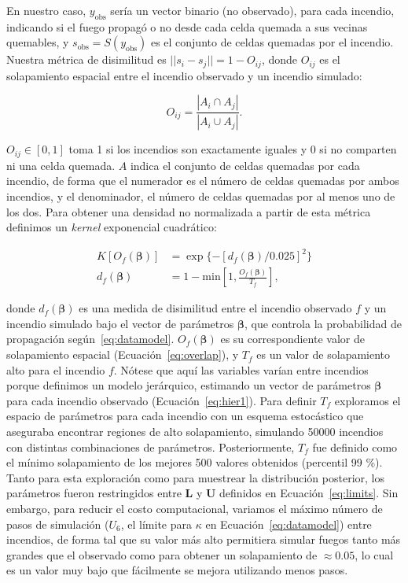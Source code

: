 En nuestro caso, $y_{\text{obs}}$ sería un vector binario (no observado), para cada incendio, indicando si el fuego propagó o no desde cada celda quemada a sus vecinas quemables, y $s_{\text{obs}} = S(y_{\text{obs}})$ es el conjunto de celdas quemadas por el incendio. Nuestra métrica de disimilitud es $||s_i - s_j|| = 1 - O_{ij}$, donde $O_{ij}$ es el solapamiento espacial entre el incendio observado y un incendio simulado: 

\begin{equation}
\label{eq:overlap}
O_{ij} = \frac{|A_i \cap A_j|}{|A_i \cup A_j|}.
\end{equation}

\noindent $O_{ij} \in [0, 1]$ toma 1 si los incendios son exactamente iguales y 0 si no comparten ni una celda quemada. $A$ indica el conjunto de celdas quemadas por cada incendio, de forma que el numerador es el número de celdas quemadas por ambos incendios, y el denominador, el número de celdas quemadas por al menos uno de los dos. Para obtener una densidad no normalizada a partir de esta métrica definimos un \textit{kernel} exponencial cuadrático:

\[
\begin{aligned}
    K[O_f(\boldsymbol{\beta})] &= \exp\{-[d_f(\boldsymbol{\beta}) / 0.025]^2\} \\
    d_f(\boldsymbol{\beta}) &= 1 - \text{min}\left[1, \frac{O_f(\boldsymbol{\beta})} {T_f}\right],
\end{aligned}
\]

\noindent donde $d_f(\boldsymbol{\beta})$ es una medida de disimilitud entre el incendio observado $f$ y un incendio simulado bajo el vector de parámetros $\boldsymbol{\beta}$, que controla la probabilidad de propagación según~\eqref{eq:datamodel}. $O_f(\boldsymbol{\beta})$ es su correspondiente valor de solapamiento espacial (Ecuación~\ref{eq:overlap}), y $T_f$ es un valor de solapamiento alto para el incendio $f$. Nótese que aquí las variables varían entre incendios porque definimos un modelo jerárquico, estimando un vector de parámetros $\boldsymbol{\beta}$ para cada incendio observado (Ecuación~\ref{eq:hier1}). Para definir $T_f$ exploramos el espacio de parámetros para cada incendio con un esquema estocástico que aseguraba encontrar regiones de alto solapamiento, simulando 50000 incendios con distintas combinaciones de parámetros. Posteriormente, $T_f$ fue definido como el mínimo solapamiento de los mejores 500 valores obtenidos (percentil 99 \%). Tanto para esta exploración como para muestrear la distribución posterior, los parámetros fueron restringidos entre $\boldsymbol{L}$ y $\boldsymbol{U}$ definidos en Ecuación~\ref{eq:limits}. Sin embargo, para reducir el costo computacional, variamos el máximo número de pasos de simulación ($U_6$, el límite para $\kappa$ en Ecuación~\ref{eq:datamodel}) entre incendios, de forma tal que su valor más alto permitiera simular fuegos tanto más grandes que el observado como para obtener un solapamiento de $\approx 0.05$, lo cual es un valor muy bajo que fácilmente se mejora utilizando menos pasos.


